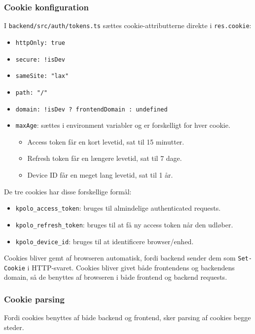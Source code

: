\subsubsection{Cookie konfiguration}
I \texttt{backend/src/auth/tokens.ts} sættes cookie-attributterne direkte i \texttt{res.cookie}:
\begin{itemize}
    \item \texttt{httpOnly: true}
    \item \texttt{secure: !isDev}
    \item \texttt{sameSite: "lax"}
    \item \texttt{path: "/"}
    \item \texttt{domain: !isDev ? frontendDomain : undefined}
    \item \texttt{maxAge}: sættes i environment variabler og er forskelligt for hver cookie.
    \begin{itemize}
        \item Access token får en kort levetid, sat til 15 minutter.
        \item Refresh token får en længere levetid, sat til 7 dage.
        \item Device ID får en meget lang levetid, sat til 1 år.
    \end{itemize}
\end{itemize}

De tre cookies har disse forskellige formål:
\begin{itemize}
    \item \texttt{kpolo\_access\_token}: bruges til almindelige authenticated requests.
    \item \texttt{kpolo\_refresh\_token}: bruges til at få ny access token når den udløber.
    \item \texttt{kpolo\_device\_id}: bruges til at identificere browser/enhed.
\end{itemize}
Cookies bliver gemt af browseren automatisk, fordi backend sender dem som \texttt{Set-Cookie} i HTTP-svaret.
Cookies bliver givet både frontendens og backendens domain, så de benyttes af browseren i både frontend og backend requests.

\subsubsection{Cookie parsing}
Fordi cookies benyttes af både backend og frontend, sker parsing af cookies begge steder.

